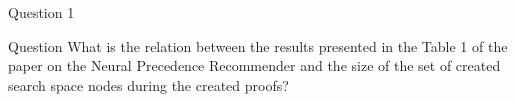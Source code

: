 \begin{frame}{Question 1}
\begin{block}{Question}
What is the relation between the results presented in the Table 1 of the paper on the Neural Precedence Recommender and the size of the set of created search space nodes during the created proofs?
\end{block}
%
\end{frame}
